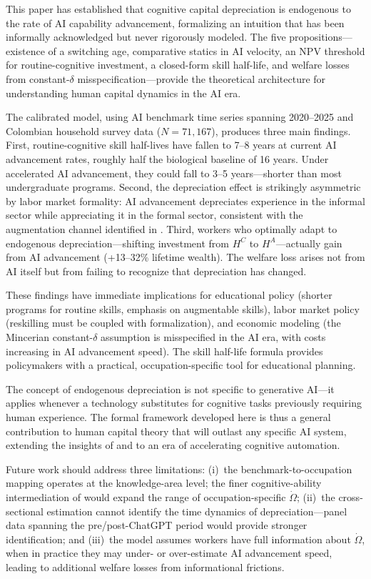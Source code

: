 \documentclass[11pt,a4paper]{article}
\theoremstyle{definition}
\begin{document}
This paper has established that cognitive capital depreciation is endogenous to the rate of AI capability advancement, formalizing an intuition that has been informally acknowledged but never rigorously modeled. The five propositions---existence of a switching age, comparative statics in AI velocity, an NPV threshold for routine-cognitive investment, a closed-form skill half-life, and welfare losses from constant-$\delta$ misspecification---provide the theoretical architecture for understanding human capital dynamics in the AI era.

The calibrated model, using AI benchmark time series spanning 2020--2025 and Colombian household survey data ($N = 71{,}167$), produces three main findings. First, routine-cognitive skill half-lives have fallen to 7--8 years at current AI advancement rates, roughly half the biological baseline of 16 years. Under accelerated AI advancement, they could fall to 3--5 years---shorter than most undergraduate programs. Second, the depreciation effect is strikingly asymmetric by labor market formality: AI advancement depreciates experience in the informal sector while appreciating it in the formal sector, consistent with the augmentation channel identified in \citet{espinal2026ahc}. Third, workers who optimally adapt to endogenous depreciation---shifting investment from $H^C$ to $H^A$---actually gain from AI advancement (+13--32\% lifetime wealth). The welfare loss arises not from AI itself but from failing to recognize that depreciation has changed.

These findings have immediate implications for educational policy (shorter programs for routine skills, emphasis on augmentable skills), labor market policy (reskilling must be coupled with formalization), and economic modeling (the Mincerian constant-$\delta$ assumption is misspecified in the AI era, with costs increasing in AI advancement speed). The skill half-life formula provides policymakers with a practical, occupation-specific tool for educational planning.

The concept of endogenous depreciation is not specific to generative AI---it applies whenever a technology substitutes for cognitive tasks previously requiring human experience. The formal framework developed here is thus a general contribution to human capital theory that will outlast any specific AI system, extending the insights of \citet{benporath1967production} and \citet{chari1991vintage} to an era of accelerating cognitive automation.

Future work should address three limitations: (i)~the benchmark-to-occupation mapping operates at the knowledge-area level; the finer cognitive-ability intermediation of \citet{tolan2021measuring} would expand the range of occupation-specific $\dot{\Omega}$; (ii)~the cross-sectional estimation cannot identify the time dynamics of depreciation---panel data spanning the pre/post-ChatGPT period would provide stronger identification; and (iii)~the model assumes workers have full information about $\dot{\Omega}$, when in practice they may under- or over-estimate AI advancement speed, leading to additional welfare losses from informational frictions.
\end{document}
